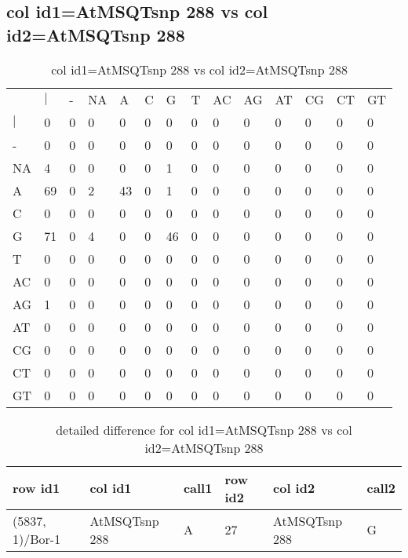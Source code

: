 \subsection{col id1=AtMSQTsnp 288 vs col id2=AtMSQTsnp 288}
\begin{center}
\begin{longtable}{|l|l|l|l|l|l|l|l|l|l|l|l|l|l|}
\caption{col id1=AtMSQTsnp 288 vs col id2=AtMSQTsnp 288} \label{table_dm628}\\
\hline
\\
\hline
&$|$&-&NA&A&C&G&T&AC&AG&AT&CG&CT&GT\\
$|$&0&0&0&0&0&0&0&0&0&0&0&0&0\\
-&0&0&0&0&0&0&0&0&0&0&0&0&0\\
NA&4&0&0&0&0&1&0&0&0&0&0&0&0\\
A&69&0&2&43&0&1&0&0&0&0&0&0&0\\
C&0&0&0&0&0&0&0&0&0&0&0&0&0\\
G&71&0&4&0&0&46&0&0&0&0&0&0&0\\
T&0&0&0&0&0&0&0&0&0&0&0&0&0\\
AC&0&0&0&0&0&0&0&0&0&0&0&0&0\\
AG&1&0&0&0&0&0&0&0&0&0&0&0&0\\
AT&0&0&0&0&0&0&0&0&0&0&0&0&0\\
CG&0&0&0&0&0&0&0&0&0&0&0&0&0\\
CT&0&0&0&0&0&0&0&0&0&0&0&0&0\\
GT&0&0&0&0&0&0&0&0&0&0&0&0&0\\
\hline
\end{longtable}
\end{center}

\begin{center}
\begin{longtable}{|l|l|l|l|l|l|}
\caption{detailed difference for col id1=AtMSQTsnp 288 vs col id2=AtMSQTsnp 288} \label{table_dm629}\\
\hline
row id1&col id1&call1&row id2&col id2&call2\\
\hline
(5837, 1)/Bor-1&AtMSQTsnp 288&A&27&AtMSQTsnp 288&G\\
\hline
\end{longtable}
\end{center}

